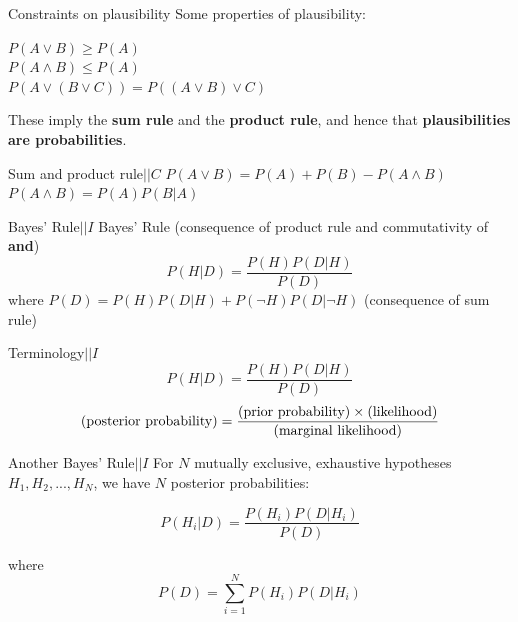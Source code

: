 \documentclass{beamer}
\begin{document}
\begin{frame}[t]{Constraints on plausibility}
Some properties of plausibility:\vspace{20pt}

$P(A \vee B) \geq P(A)$\\
$P(A \wedge B) \leq P(A)$\\
$P(A \vee (B \vee C)) = P((A \vee B) \vee C)$\vspace{20pt}

These imply the {\bf sum rule} and the {\bf product rule}, and hence that
{\bf plausibilities are probabilities}.
\end{frame}

\begin{frame}[t]{Sum and product rule\hspace{170pt}$|| C$}
$P(A \vee B) = P(A) + P(B) - P(A \wedge B)$\\
\vspace{20pt}
$P(A \wedge B) = P(A)P(B|A)$
\end{frame}

\begin{frame}[t]{Bayes' Rule\hspace{170pt}$|| I$}
Bayes' Rule (consequence of product rule and commutativity of {\bf and})
\begin{equation}
P(H | D) = \frac{P(H)P(D|H)}{P(D)}
\end{equation}
where\vspace{20pt}
$P(D) = P(H)P(D | H) + P(\neg H)P(D | \neg H)$
(consequence of sum rule)
\end{frame}

\begin{frame}[t]{Terminology\hspace{170pt}$|| I$}
\begin{equation}
P(H | D) = \frac{P(H)P(D|H)}{P(D)}
\end{equation}
\begin{equation}
\textnormal{(posterior probability)} =
\frac{\textnormal{(prior probability)}\times\textnormal{(likelihood)}}{\textnormal{(marginal likelihood)}}
\end{equation}
\end{frame}

\begin{frame}[t]{Another Bayes' Rule\hspace{170pt}$|| I$}
For $N$ mutually exclusive, exhaustive hypotheses
$H_1, H_2, ..., H_N$, we have $N$ posterior probabilities:

\begin{equation}
P(H_i | D) = \frac{P(H_i)P(D|H_i)}{P(D)}
\end{equation}

where
\begin{equation}
P(D) = \sum_{i=1}^N P(H_i)P(D|H_i)
\end{equation}
\end{frame}
\end{document}
